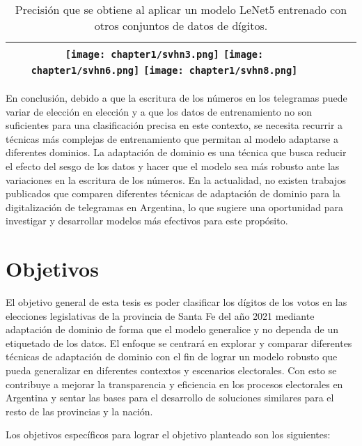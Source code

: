 \begin{table}[H]
\begin{tabular}{c|ccc}
        \texttt{[image: chapter1/svhn3.png]}
        \texttt{[image: chapter1/svhn6.png]}
        \texttt{[image: chapter1/svhn8.png]}                              &                                                   &                                   &                                   \\
        \bottomrule
    \end{tabular}
    \caption{Precisión que se obtiene al aplicar un modelo LeNet5 entrenado con otros conjuntos de datos de dígitos.}
    \label{tab:lenet-distintos-datasets}
\end{table}

En conclusión, debido a que la escritura de los números en los telegramas puede variar de elección en elección y a que
los datos de entrenamiento no son suficientes para una clasificación precisa en este contexto, se necesita recurrir a
técnicas más complejas de entrenamiento que permitan al modelo adaptarse a diferentes dominios. La adaptación de
dominio es una técnica que busca reducir el efecto del sesgo de los datos y hacer que el modelo sea más robusto ante
las variaciones en la escritura de los números. En la actualidad, no existen trabajos publicados que comparen
diferentes técnicas de adaptación de dominio para la digitalización de telegramas en Argentina, lo que sugiere una
oportunidad para investigar y desarrollar modelos más efectivos para este propósito.

\section{Objetivos}

El objetivo general de esta tesis es poder clasificar los dígitos de los votos en las elecciones legislativas de la
provincia de Santa Fe del año 2021 mediante adaptación de dominio de forma que el modelo generalice y no dependa de un
etiquetado de los datos. El enfoque se centrará en explorar y comparar diferentes técnicas de adaptación de dominio con
el fin de lograr un modelo robusto que pueda generalizar en diferentes contextos y escenarios electorales. Con esto se
contribuye a mejorar la transparencia y eficiencia en los procesos electorales en Argentina y sentar las bases para el
desarrollo de soluciones similares para el resto de las provincias y la nación.

Los objetivos específicos para lograr el objetivo planteado son los siguientes:

